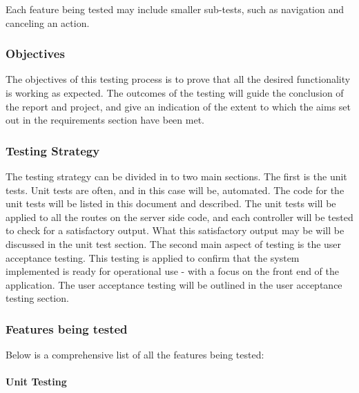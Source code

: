 \documentclass[a4paper]{article}
\newcommand{\subsubsubsection}[1]{\paragraph{#1}\mbox{}\\}
\begin{document}
Each feature being tested may include smaller sub-tests, such as navigation and canceling an action.
\subsubsection{Objectives}
The objectives of this testing process is to prove that all the desired functionality is working as expected. The outcomes of the testing will guide the conclusion of the report and project, and give an indication of the extent to which the aims set out in the requirements section have been met.
\subsubsection{Testing Strategy}
The testing strategy can be divided in to two main sections. The first is the unit tests. Unit tests are often, and in this case will be, automated. The code for the unit tests will be listed in this document and described. The unit tests will be applied to all the routes on the server side code, and each controller will be tested to check for a satisfactory output. What this satisfactory output may be will be discussed in the unit test section.  The second main aspect of testing is the user acceptance testing. This testing is applied to confirm that the system implemented is ready for operational use - with a focus on the front end of the application. The user acceptance testing will be outlined in the user acceptance testing section.
\subsubsection{Features being tested}
Below is a comprehensive list of all the features being tested:
\subsubsubsection{Unit Testing}
\end{document}
